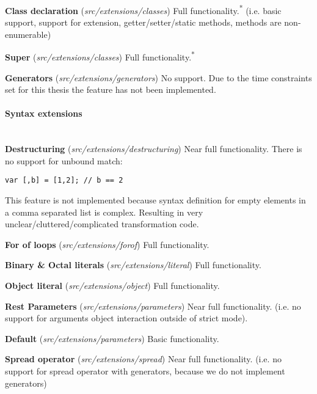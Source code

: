 \textbf{Class declaration} (\textit{src/extensions/classes}) \newline
Full functionality.\textsuperscript{*} (i.e. basic support, support for extension, getter/setter/static methods, methods are non-enumerable)

\textbf{Super} (\textit{src/extensions/classes}) \newline
Full functionality.\textsuperscript{*}

\textbf{Generators} (\textit{src/extensions/generators}) \newline
No support. Due to the time constraints set for this thesis the feature has not been implemented.

\paragraph{Syntax extensions}\mbox{}\\
\textbf{Destructuring} (\textit{src/extensions/destructuring}) \newline
Near full functionality. There is no support for unbound match:
\begin{lstlisting}
var [,b] = [1,2]; // b == 2
\end{lstlisting}
This feature is not implemented because syntax definition for empty elements in a comma separated list is complex. Resulting in very unclear/cluttered/complicated transformation code.

\textbf{For of loops} (\textit{src/extensions/forof}) \newline
Full functionality.

\textbf{Binary \& Octal literals} (\textit{src/extensions/literal}) \newline
Full functionality.

\textbf{Object literal} (\textit{src/extensions/object}) \newline
Full functionality.

\textbf{Rest Parameters} (\textit{src/extensions/parameters}) \newline
Near full functionality. (i.e. no support for arguments object interaction outside of strict mode).

\textbf{Default} (\textit{src/extensions/parameters}) \newline
Basic functionality.

\textbf{Spread operator} (\textit{src/extensions/spread}) \newline
Near full functionality. (i.e. no support for spread operator with generators, because we do not implement generators)

